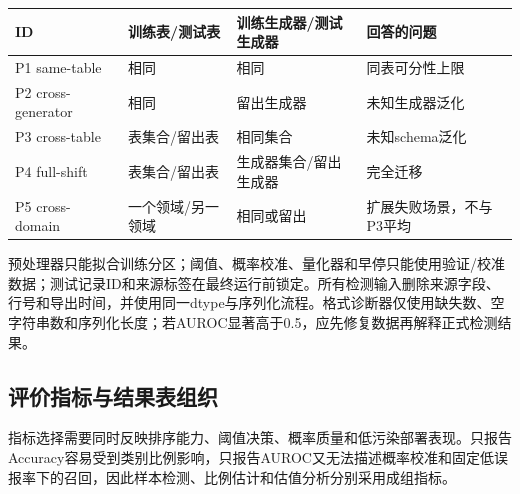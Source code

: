 \documentclass[
  chinese,
  12pt,
  a4paper,
  chinese,
  UTF8]{ctexart}
\begin{document}
\begin{longtable}[]{@{}
  >{\raggedright\arraybackslash}p{}
  >{\raggedright\arraybackslash}p{}
  >{\raggedright\arraybackslash}p{}
  >{\raggedright\arraybackslash}p{}@{}}
\toprule\noalign{}
\begin{minipage}[b]{\linewidth}\raggedright
ID
\end{minipage} & \begin{minipage}[b]{\linewidth}\raggedright
训练表/测试表
\end{minipage} & \begin{minipage}[b]{\linewidth}\raggedright
训练生成器/测试生成器
\end{minipage} & \begin{minipage}[b]{\linewidth}\raggedright
回答的问题
\end{minipage} \\
\midrule\noalign{}
\endhead
\bottomrule\noalign{}
\endlastfoot
P1 same-table & 相同 & 相同 & 同表可分性上限 \\
P2 cross-generator & 相同 & 留出生成器 & 未知生成器泛化 \\
P3 cross-table & 表集合/留出表 & 相同集合 & 未知schema泛化 \\
P4 full-shift & 表集合/留出表 & 生成器集合/留出生成器 & 完全迁移 \\
P5 cross-domain & 一个领域/另一领域 & 相同或留出 &
扩展失败场景，不与P3平均 \\
\end{longtable}

预处理器只能拟合训练分区；阈值、概率校准、量化器和早停只能使用验证/校准数据；测试记录ID和来源标签在最终运行前锁定。所有检测输入删除来源字段、行号和导出时间，并使用同一dtype与序列化流程。格式诊断器仅使用缺失数、空字符串数和序列化长度；若AUROC显著高于0.5，应先修复数据再解释正式检测结果。

\subsection{评价指标与结果表组织}\label{ux8bc4ux4ef7ux6307ux6807ux4e0eux7ed3ux679cux8868ux7ec4ux7ec7}

指标选择需要同时反映排序能力、阈值决策、概率质量和低污染部署表现。只报告Accuracy容易受到类别比例影响，只报告AUROC又无法描述概率校准和固定低误报率下的召回，因此样本检测、比例估计和估值分析分别采用成组指标。
\end{document}
